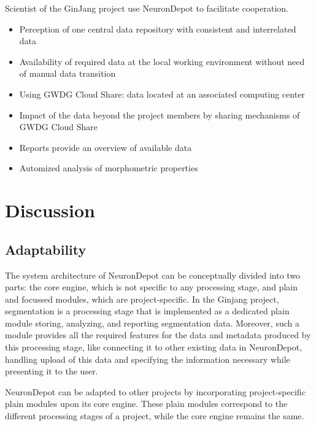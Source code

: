 \documentclass{frontiersSCNS} %
\begin{document}
Scientist of the GinJang project use NeuronDepot to facilitate cooperation. 

\begin{itemize}
    \item Perception of one central data repository with consistent and
        interrelated data
    \item Availability of required data at the local working environment
        without need of manual data transition
    \item Using GWDG Cloud Share: data located at an associated computing center
    \item Impact of the data beyond the project members by sharing mechanisms
        of GWDG Cloud Share
    \item Reports provide an overview of available data
    \item Automized analysis of morphometric properties
\end{itemize}

\section{Discussion}

\subsection{Adaptability}
The system architecture of NeuronDepot can be conceptually divided into two
parts: the core engine, which is not specific to any processing stage, and
plain and focussed modules, which are project-specific. In the Ginjang project,
segmentation is a processing stage that is implemented as a dedicated plain
module storing, analyzing, and reporting segmentation data. Moreover, such a
module provides all the required features for the data and metadata produced by
this processing stage, like connecting it to other existing data in
NeuronDepot, handling upload of this data and specifying the information
necessary while presenting it to the user.

NeuronDepot can be adapted to other projects by incorporating project-specific
plain modules upon its core engine. These plain modules correspond to the
different processing stages of a project, while the core engine
remains the same.
\end{document}
